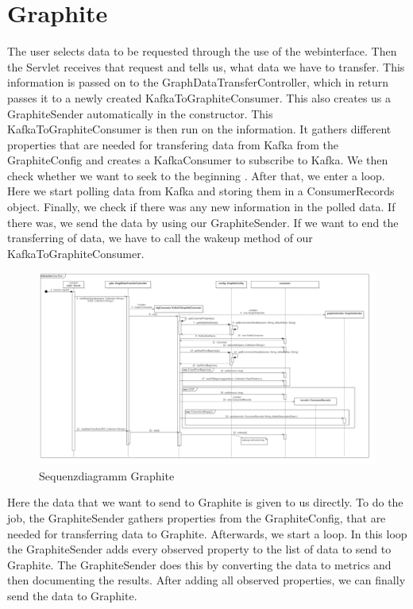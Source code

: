 {{{{{\section{Graphite}
The user selects data to be requested through the use of the webinterface. Then the Servlet receives that request and tells us, what data we have to transfer. This information is passed on to the GraphDataTransferController, which in return passes it to a newly created KafkaToGraphiteConsumer. This also creates us a GraphiteSender automatically in the constructor. This KafkaToGraphiteConsumer is then run on the information. It gathers different properties that are needed for transfering data from Kafka from the GraphiteConfig and creates a KafkaConsumer to subscribe to Kafka. We then check whether we want to seek to the beginning . After that, we enter a loop. Here we start polling data from Kafka and storing them in a ConsumerRecords object. Finally, we check if there was any new information in the polled data. If there was, we send the data by using our GraphiteSender.
If we want to end the transferring of data, we have to call the wakeup method of our KafkaToGraphiteConsumer.
\begin{figure}[!hbp]
	\centering
	\includegraphics[width=\linewidth]{images/graphite/graphiteMainSequenceDiagram_small.png}
	\caption{Sequenzdiagramm Graphite}
\end{figure}
\newpage
Here the data that we want to send to Graphite is given to us directly. To do the job, the GraphiteSender gathers properties from the GraphiteConfig, that are needed for transferring data to Graphite. Afterwards, we start a loop. In this loop the GraphiteSender adds every observed property to the list of data to send to Graphite. The GraphiteSender does this by converting the data to metrics and then documenting the results. After adding all observed properties, we can finally send the data to Graphite.
}}}}}
